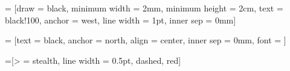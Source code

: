 \newcommand{\slotheight}{2cm}
\newcommand{\slotwidth}{2mm}
\newcommand{\numchannels}{10}
\newcommand{\fsperchannel}{5}
\newcommand{\lw}{1pt}

 = [draw = black,
					minimum width = \slotwidth, 
				    minimum height = \slotheight, 
					text = black!100, 
					anchor = west, 
					line width = \lw,
					inner sep = 0mm]
					
 = [text = black,
						  anchor = north, 
						  align = center, 
						  inner sep = 0mm,
						  font = \scriptsize]

=[> = stealth, line width = 0.5pt, dashed, red]

\newcommand{\spectrum}[4]{%
	\path (#1) coordinate (start);
	\fill[fill opacity=0.5, fill=#3]
	($(start) + (0, \lw)$)
	-- ($ (start) + (#2*0.5*\slotwidth-0.5*\lw,\lw) $)
	arc[start angle=0, end angle=180, x radius=#2*0.5*\slotwidth-0.5*\lw, y radius=#4-\lw]
	-- cycle;
}

\newcommand{\oneslot}[2]{
	\spectrum{#1}{1}{blue}{#2}
}

\newcommand{\twoslot}[2]{
	\spectrum{#1}{2}{blue}{#2}
}

\newcommand{\threeslot}[2]{
	\spectrum{#1}{3}{violet}{#2}
}

\newcommand{\fourslot}[2]{
	\spectrum{#1}{4}{ForestGreen}{#2}
}

\newcommand{\fiveslot}[2]{
	\spectrum{#1}{5}{red}{#2}
}

\newcommand{\twelveslot}[2]{
	\spectrum{#1}{12}{orange}{#2}
}




